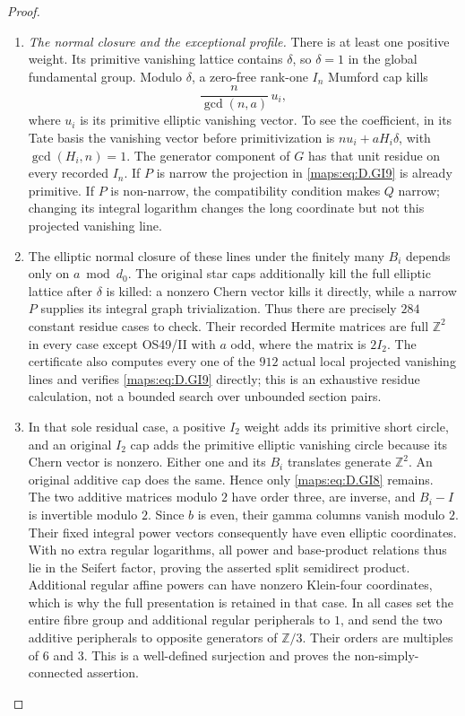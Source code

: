 \begin{proof}
\begin{enumerate}[label=\arabic*.,leftmargin=*]
\item \emph{The normal closure and the exceptional profile.}
There is at least one positive weight. Its primitive
vanishing lattice contains $\delta$, so $\delta=1$
in the global fundamental group. Modulo $\delta$,
a zero-free rank-one $I_n$ Mumford cap kills
\[
                   \frac{n}{\gcd(n,a)}\,u_i,              \tag{D.GI9}\label{maps:eq:D.GI9}
\]
where $u_i$ is its primitive elliptic vanishing vector.
To see the coefficient, in its Tate basis the
vanishing vector before primitivization is
$nu_i+aH_i\delta$, with
$\gcd(H_i,n)=1$. The generator component of $G$
has that unit residue on every recorded $I_n$.
If $P$ is narrow the projection in \eqref{maps:eq:D.GI9} is
already primitive. If $P$ is non-narrow, the
compatibility condition makes $Q$ narrow; changing
its integral logarithm changes the long coordinate
but not this projected vanishing line.

\item The elliptic normal closure of these lines under
the finitely many $B_i$ depends only on
$a\bmod d_0$. The original star caps additionally
kill the full elliptic lattice after $\delta$ is
killed: a nonzero Chern vector kills it directly,
while a narrow $P$ supplies its integral graph
trivialization. Thus there are precisely $284$
constant residue cases to check. Their recorded
Hermite matrices are full $\mathbb Z^2$ in every
case except OS49/II with $a$ odd, where the matrix
is $2I_2$. The certificate also computes every
one of the $912$ actual local projected vanishing
lines and verifies \eqref{maps:eq:D.GI9} directly; this is an
exhaustive residue calculation, not a bounded
search over unbounded section pairs.

\item In that sole residual case, a positive $I_2$
weight adds its primitive short circle, and an
original $I_2$ cap adds the primitive elliptic
vanishing circle because its Chern vector is
nonzero. Either one and its $B_i$ translates
generate $\mathbb Z^2$. An original additive
cap does the same. Hence only \eqref{maps:eq:D.GI8} remains.
The two additive matrices modulo $2$ have order
three, are inverse, and $B_i-I$ is invertible
modulo $2$. Since $b$ is even, their gamma
columns vanish modulo $2$. Their fixed integral
power vectors consequently have even elliptic
coordinates. With no extra regular logarithms,
all power and base-product relations thus lie
in the Seifert factor, proving the asserted
split semidirect product. Additional regular
affine powers can have nonzero Klein-four
coordinates, which is why the full presentation
is retained in that case. In all cases set
the entire fibre group and additional regular
peripherals to $1$, and send the two additive
peripherals to opposite generators of $\mathbb Z/3$.
Their orders are multiples of $6$ and $3$.
This is a well-defined surjection and proves
the non-simply-connected assertion.


\end{enumerate}
\end{proof}
